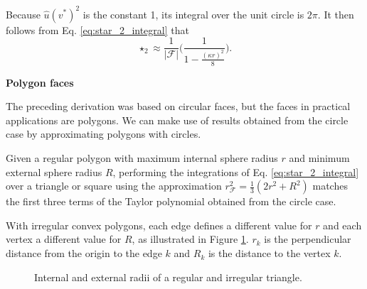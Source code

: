\documentclass[utf8,english]{gradu3}
\begin{document}
Because $\hat{u}(v^*)^2$ is the constant 1, its integral over the unit circle is $2\pi$.
It then follows from Eq. \eqref{eq:star_2_integral} that
\begin{equation}\label{eq:star_2_harmonic}
  \star_2 \approx \frac{1}{|\mathcal{F}|}
  \Big( \frac{1}{1 - \frac{(\kappa r)^2}{8}} \Big).
\end{equation}

\textbf{Polygon faces}

The preceding derivation was based on circular faces,
but the faces in practical applications are polygons.
We can make use of results obtained from the circle case
by approximating polygons with circles.

Given a regular polygon with maximum internal sphere radius $r$
and minimum external sphere radius $R$,
performing the integrations of Eq. \eqref{eq:star_2_integral}
over a triangle or square
using the approximation $r^2_{\mathcal{F}} = \frac{1}{3} (2r^2 + R^2)$
matches the first three terms of the Taylor polynomial obtained from the circle case.

With irregular convex polygons, each edge defines a different value for $r$
and each vertex a different value for $R$,
as illustrated in Figure \ref{fig:polygon_radii}.
$r_k$ is the perpendicular distance from the origin to the edge $k$
and $R_k$ is the distance to the vertex $k$.

\begin{figure}[h]
  \centering
  \caption{Internal and external radii of a regular and irregular triangle.}
  \label{fig:polygon_radii}
\end{figure}
\end{document}
